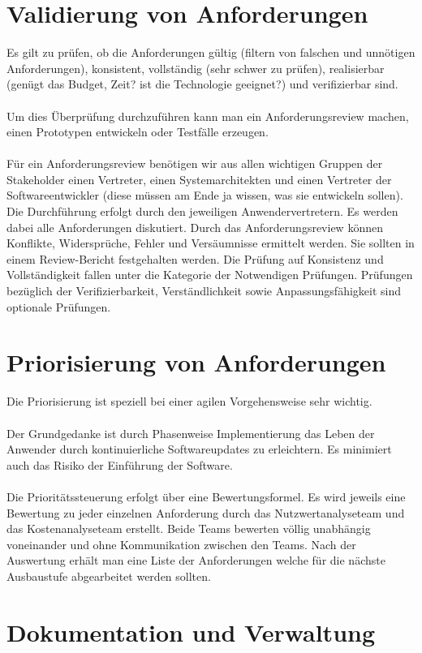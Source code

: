 \section{Validierung von Anforderungen}
Es gilt zu prüfen, ob die Anforderungen gültig (filtern von falschen und unnötigen Anforderungen), konsistent, vollständig (sehr schwer zu prüfen), realisierbar (genügt das Budget, Zeit? ist die Technologie geeignet?) und verifizierbar sind.
\\\\
Um dies Überprüfung durchzuführen kann man ein Anforderungsreview machen, einen Prototypen entwickeln oder Testfälle erzeugen.
\\\\
Für ein Anforderungsreview benötigen wir aus allen wichtigen Gruppen der Stakeholder einen Vertreter, einen Systemarchitekten und einen Vertreter der Softwareentwickler (diese müssen am Ende ja wissen, was sie entwickeln sollen). Die Durchführung erfolgt durch den jeweiligen Anwendervertretern. Es werden dabei alle Anforderungen diskutiert. Durch das Anforderungsreview können Konflikte, Widersprüche, Fehler und Versäumnisse ermittelt werden. Sie sollten in einem Review-Bericht festgehalten werden. Die Prüfung auf Konsistenz und Vollständigkeit fallen unter die Kategorie der Notwendigen Prüfungen. Prüfungen bezüglich der Verifizierbarkeit, Verständlichkeit sowie Anpassungsfähigkeit sind optionale Prüfungen.

\section{Priorisierung von Anforderungen}
Die Priorisierung ist speziell bei einer agilen Vorgehensweise sehr wichtig. 
\\\\
Der Grundgedanke ist durch Phasenweise Implementierung das Leben der Anwender durch kontinuierliche Softwareupdates zu erleichtern. Es minimiert auch das Risiko der Einführung der Software.
\\\\
Die Prioritätssteuerung erfolgt über eine Bewertungsformel. Es wird jeweils eine Bewertung zu jeder einzelnen Anforderung durch das Nutzwertanalyseteam und das Kostenanalyseteam erstellt.  Beide Teams bewerten völlig unabhängig voneinander und ohne Kommunikation zwischen den Teams. Nach der Auswertung erhält man eine Liste der Anforderungen welche für die nächste Ausbaustufe abgearbeitet werden sollten. 

\section{Dokumentation und Verwaltung}
